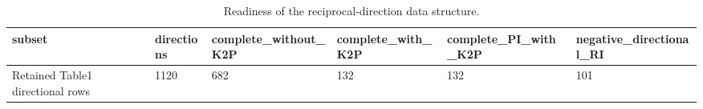 \begin{table}
\caption{Readiness of the reciprocal-direction data structure.}
\label{tab:directional_readiness}
\begin{adjustbox}{max width=\textwidth}
\begin{tabular}{llllll}
\toprule
subset & directions & complete\_without\_K2P & complete\_with\_K2P & complete\_PI\_with\_K2P & negative\_directional\_RI \\
\midrule
Retained Table1 directional rows & 1120 & 682 & 132 & 132 & 101 \\
\bottomrule
\end{tabular}
\end{adjustbox}
\end{table}
